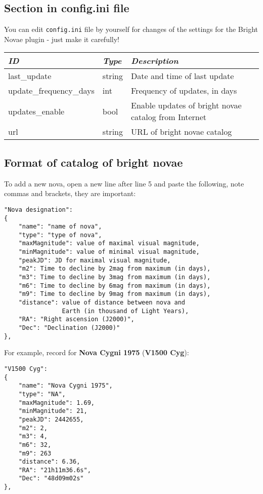 \subsection{Section  in config.ini
file}\label{section-novae-in-config.ini-file}

You can edit \texttt{config.ini} file by yourself for changes of the
settings for the Bright Novae plugin - just make it carefully!

\begin{longtabu} to \textwidth {l|l|X}
\toprule
\emph{ID} & \emph{Type} & \emph{Description}\tabularnewline
\midrule
last\_update & string & Date and time of last update\tabularnewline
\midrule
update\_frequency\_days & int & Frequency of updates, in days\tabularnewline
\midrule
updates\_enable & bool & Enable updates of bright novae catalog from Internet \tabularnewline
\midrule
url & string & URL of bright novae catalog \tabularnewline
\bottomrule
\end{longtabu}

\subsection{Format of catalog of bright novae}\label{format-of-catalog-of-bright-novae}

To add a new nova, open a new line after line 5 and paste the following,
note commas and brackets, they are important:

\begin{config}
\begin{verbatim}
"Nova designation":
{
    "name": "name of nova",
    "type": "type of nova",
    "maxMagnitude": value of maximal visual magnitude,
    "minMagnitude": value of minimal visual magnitude,
    "peakJD": JD for maximal visual magnitude,
    "m2": Time to decline by 2mag from maximum (in days),
    "m3": Time to decline by 3mag from maximum (in days),
    "m6": Time to decline by 6mag from maximum (in days),
    "m9": Time to decline by 9mag from maximum (in days),
    "distance": value of distance between nova and 
                Earth (in thousand of Light Years),
    "RA": "Right ascension (J2000)",
    "Dec": "Declination (J2000)"
},
\end{verbatim}
\end{config}

\newpage
For example, record for \textbf{Nova Cygni 1975} (\textbf{V1500 Cyg}):

\begin{config}
\begin{verbatim}
"V1500 Cyg":
{
    "name": "Nova Cygni 1975",
    "type": "NA",
    "maxMagnitude": 1.69,
    "minMagnitude": 21,
    "peakJD": 2442655,
    "m2": 2,
    "m3": 4,
    "m6": 32,
    "m9": 263
    "distance": 6.36,
    "RA": "21h11m36.6s",
    "Dec": "48d09m02s"
},
\end{verbatim}
\end{config}

